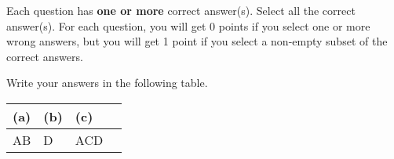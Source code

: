 
Each question has \textbf{one or more} correct answer(s). Select all the correct answer(s). For each question, you will get 0 points if you select one or more wrong answers, but you will get 1 point if you select a non-empty subset of the correct answers.

Write your answers in the following table.

\begin{table}[htbp]
    \centering
    \begin{tabular}{|p{2cm}|p{2cm}|p{2cm}|p{2cm}|}
        \hline
        (a) & (b) & (c) \\
        \hline
        AB  & D   & ACD \\
        \hline
    \end{tabular}
\end{table}

